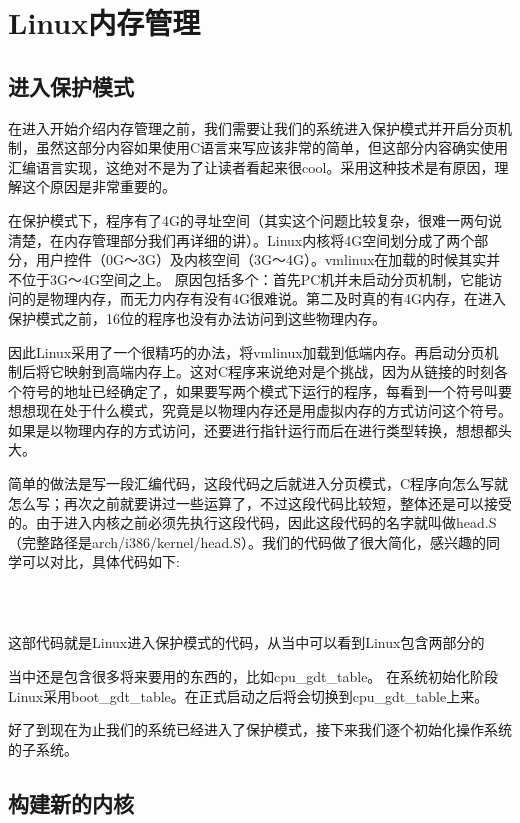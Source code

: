 
\chapter{Linux内存管理}

\section{进入保护模式}
在进入开始介绍内存管理之前，我们需要让我们的系统进入保护模式并开启分页机制，虽然这部分内容如果使用C语言来写应该非常的简单，但这部分内容确实使用汇编语言实现，这绝对不是为了让读者看起来很cool。采用这种技术是有原因，理解这个原因是非常重要的。

在保护模式下，程序有了4G的寻址空间（其实这个问题比较复杂，很难一两句说清楚，在内存管理部分我们再详细的讲）。Linux内核将4G空间划分成了两个部分，用户控件（0G～3G）及内核空间（3G～4G）。vmlinux在加载的时候其实并不位于3G～4G空间之上。
原因包括多个：首先PC机并未启动分页机制，它能访问的是物理内存，而无力内存有没有4G很难说。第二及时真的有4G内存，在进入保护模式之前，16位的程序也没有办法访问到这些物理内存。

因此Linux采用了一个很精巧的办法，将vmlinux加载到低端内存。再启动分页机制后将它映射到高端内存上。这对C程序来说绝对是个挑战，因为从链接的时刻各个符号的地址已经确定了，如果要写两个模式下运行的程序，每看到一个符号叫要想想现在处于什么模式，究竟是以物理内存还是用虚拟内存的方式访问这个符号。如果是以物理内存的方式访问，还要进行指针运行而后在进行类型转换，想想都头大。

简单的做法是写一段汇编代码，这段代码之后就进入分页模式，C程序向怎么写就怎么写；再次之前就要讲过一些运算了，不过这段代码比较短，整体还是可以接受的。由于进入内核之前必须先执行这段代码，因此这段代码的名字就叫做head.S（完整路径是arch/i386/kernel/head.S）。我们的代码做了很大简化，感兴趣的同学可以对比，具体代码如下:
\begin{lstlisting}

	
\end{lstlisting}
这部代码就是Linux进入保护模式的代码，从当中可以看到Linux包含两部分的

当中还是包含很多将来要用的东西的，比如cpu\_gdt\_table。 在系统初始化阶段Linux采用boot\_gdt\_table。在正式启动之后将会切换到cpu\_gdt\_table上来。

好了到现在为止我们的系统已经进入了保护模式，接下来我们逐个初始化操作系统的子系统。


\section{构建新的内核}

